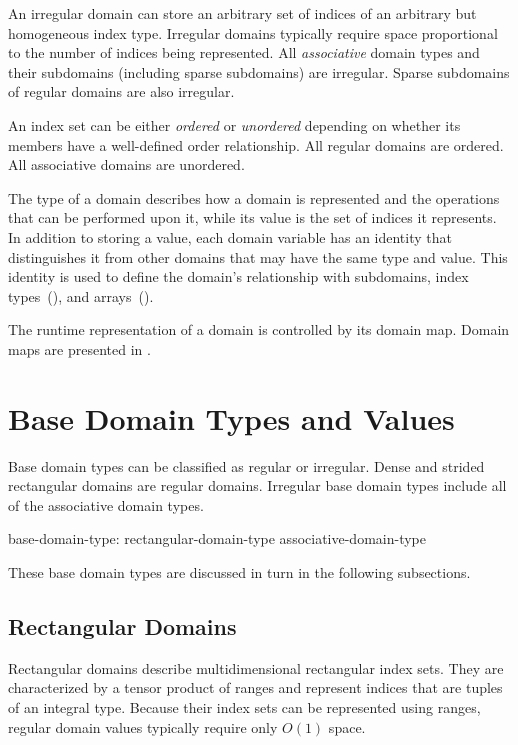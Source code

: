 An irregular domain can store an arbitrary set of indices of an arbitrary but
homogeneous index type.  Irregular domains typically require space proportional
to the number of indices being represented.  All \emph{associative} domain types
and their subdomains (including sparse subdomains) are irregular.  Sparse
subdomains of regular domains are also irregular.

An index set can be either \emph{ordered} or \emph{unordered} depending on
whether its members have a well-defined order relationship.  All regular
domains are ordered.  All associative domains are
unordered.

The type of a domain describes how a domain is represented and the operations
that can be performed upon it, while its value is the set of indices it represents.
In addition to storing a value, each domain variable has an identity that
distinguishes it from other domains that may have the same type and
value.  This identity is used to define the domain's relationship
with subdomains, index types~(),
and arrays~().

The runtime representation of a domain is controlled by its domain map.
Domain maps are presented in .


\section{Base Domain Types and Values}
\label{Base_Domain_Types_and_Values}

Base domain types can be classified as regular or irregular.  Dense and
strided rectangular domains are regular domains.
Irregular base domain types include all of the associative domain types.

\begin{syntax}
base-domain-type:
  rectangular-domain-type
  associative-domain-type
\end{syntax}

These base domain types are discussed in turn in the following
subsections.

\subsection{Rectangular Domains}

Rectangular domains describe multidimensional rectangular index sets.  They are
characterized by a tensor product of ranges and represent indices that are
tuples of an integral type.  Because their index sets can be represented using
ranges, regular domain values typically require only $O(1)$ space.

